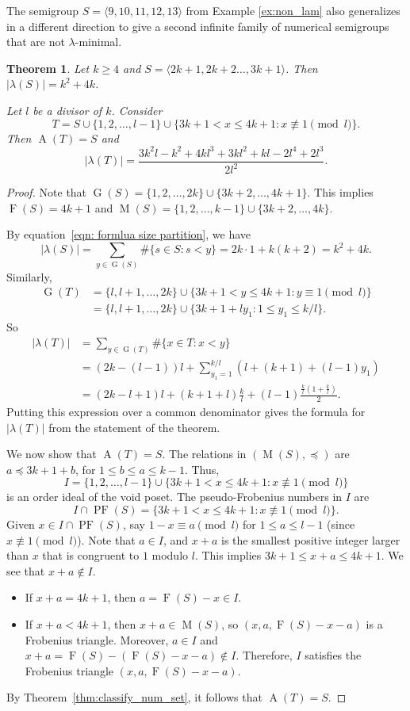 \documentclass{amsproc}
\DeclareMathOperator{\F}{F}
\DeclareMathOperator{\G}{G}
\DeclareMathOperator{\PF}{PF}
\DeclareMathOperator{\A}{A}
\DeclareMathOperator{\M}{M}
\newtheorem{theorem}{Theorem}[section]
\theoremstyle{definition}
\theoremstyle{remark}
\numberwithin{equation}{section}
\begin{document}
The semigroup $S = \langle 9,10,11,12,13\rangle$ from Example \ref{ex:non_lam} also generalizes in a different direction to give a second infinite family of numerical semigroups that are not $\lambda$-minimal.
\begin{theorem}\label{thm:2k1_3k1}
Let $k \ge 4$ and $S = \langle 2k+1,2k+2\dots,3k+1\rangle$.  Then $|\lambda(S)|=k^2+4k$.

Let $l$ be a divisor of $k$.  Consider 
\[
T=S\cup \{1,2,\dots,l-1\}\cup \{3k+1<x\leq4k+1 \colon x\not\equiv 1\pmod{l}\}.
\] 
Then $\A(T) = S$ and 
\[
|\lambda(T)|=\frac{3k^2l-k^2+4kl^3+3kl^2+kl-2l^4+2l^3}{2l^2}.
\]
\end{theorem}
\begin{proof}
Note that $\G(S)=\{1,2,\dots,2k\}\cup \{3k+2,\dots,4k+1\}$. This implies $\F(S) = 4k+1$ and $\M(S)=\{1,2,\dots,k-1\}\cup \{3k+2,\dots,4k\}$.

By equation~\eqref{eqn: formlua size partition}, we have 
\[
|\lambda(S)| = \sum_{y\in \G(S)} \#\{s\in S\colon s<y\} = 2k\cdot 1 +k(k+2)=k^2+4k.
\]
Similarly, 
\begin{align*}
\G(T)&=\{l,l+1,\dots,2k\}\cup \{3k+1<y \le 4k+1\colon y\equiv 1\pmod{l}\}\\
&=\{l,l+1,\dots,2k\} \cup \{3k+1+ly_1\colon 1\leq y_1\leq k/l\}.
\end{align*}
So
\begin{align*}
|\lambda(T)| &= \sum_{y\in \G(T)} \#\{x\in T\colon x<y\}\\
&= (2k-(l-1))l +\sum_{y_1=1}^{k/l} (l+(k+1)+(l-1) y_1)\\
&=(2k-l+1)l+(k+1+l)\frac{k}{l}+(l-1) \frac{\frac{k}{l}(1+\frac{k}{l})}{2}.
\end{align*}
Putting this expression over a common denominator gives the formula for $|\lambda(T)|$ from the statement of the theorem.

We now show that $\A(T) = S$.  The relations in $(\M(S),\preccurlyeq)$ are $a\preccurlyeq 3k+1+b$, for $1\leq b\leq a\leq k-1$. Thus,
\[
I=\{1,2,\dots,l-1\}\cup \{3k+1<x\leq 4k+1\colon x\not\equiv 1\pmod{l}\}
\]
is an order ideal of the void poset. The pseudo-Frobenius numbers in $I$ are
\[
I\cap \PF(S)= \{3k+1<x\leq 4k+1 \colon x\not\equiv 1\pmod{l}\}.
\]
Given $x\in I\cap \PF(S)$, say $1-x\equiv a\pmod{l}$ for $1\leq a\leq l-1$ (since $x\not\equiv 1\pmod{l}$). Note that $a\in I$, and $x+a$ is the smallest positive integer larger than $x$ that is congruent to $1$ modulo $l$.  This implies $3k+1\leq x+a\leq 4k+1$. We see that $x+a\notin I$. 
\begin{itemize}
    \item If $x+a=4k+1$, then $a=\F(S)-x\in I$.
    \item If $x+a<4k+1$, then $x+a\in \M(S)$, so $(x,a, \F(S)-x-a)$ is a Frobenius triangle. Moreover, $a\in I$ and $x+a= \F(S)- (\F(S)-x-a)\notin I$. Therefore, $I$ satisfies the Frobenius triangle $(x,a, \F(S)-x-a)$.
\end{itemize}
By Theorem~\ref{thm:classify_num_set}, it follows that $\A(T)=S$.
\end{proof}
\end{document}
